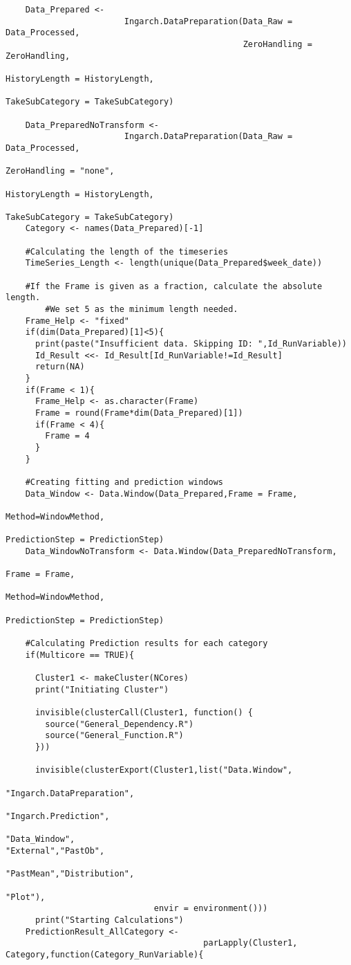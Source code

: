 \begin{verbatim}
    Data_Prepared <- 
						Ingarch.DataPreparation(Data_Raw = Data_Processed,
						                        ZeroHandling = ZeroHandling,
																		HistoryLength = HistoryLength,
																		TakeSubCategory = TakeSubCategory)
    
    Data_PreparedNoTransform <- 
						Ingarch.DataPreparation(Data_Raw = Data_Processed,
																		ZeroHandling = "none",
																		HistoryLength = HistoryLength,
																		TakeSubCategory = TakeSubCategory)
    Category <- names(Data_Prepared)[-1]
    
    #Calculating the length of the timeseries
    TimeSeries_Length <- length(unique(Data_Prepared$week_date))
    
    #If the Frame is given as a fraction, calculate the absolute length. 
		#We set 5 as the minimum length needed.
    Frame_Help <- "fixed"
    if(dim(Data_Prepared)[1]<5){
      print(paste("Insufficient data. Skipping ID: ",Id_RunVariable))
      Id_Result <<- Id_Result[Id_RunVariable!=Id_Result]
      return(NA)
    }
    if(Frame < 1){
      Frame_Help <- as.character(Frame)
      Frame = round(Frame*dim(Data_Prepared)[1])
      if(Frame < 4){
        Frame = 4
      }
    }
    
    #Creating fitting and prediction windows
    Data_Window <- Data.Window(Data_Prepared,Frame = Frame,
															 Method=WindowMethod,
														   PredictionStep = PredictionStep)
    Data_WindowNoTransform <- Data.Window(Data_PreparedNoTransform,
																					Frame = Frame,
																					Method=WindowMethod,
																					PredictionStep = PredictionStep)
  
    #Calculating Prediction results for each category 
    if(Multicore == TRUE){
      
      Cluster1 <- makeCluster(NCores)
      print("Initiating Cluster")
      
      invisible(clusterCall(Cluster1, function() {
        source("General_Dependency.R")
        source("General_Function.R")
      }))
      
      invisible(clusterExport(Cluster1,list("Data.Window",
																						"Ingarch.DataPreparation",
																						"Ingarch.Prediction",
																						"Data_Window",
"External","PastOb",
																						"PastMean","Distribution",
																						"Plot"),
                              envir = environment()))
      print("Starting Calculations")
    PredictionResult_AllCategory <- 
										parLapply(Cluster1, Category,function(Category_RunVariable){
      

\end{verbatim}
